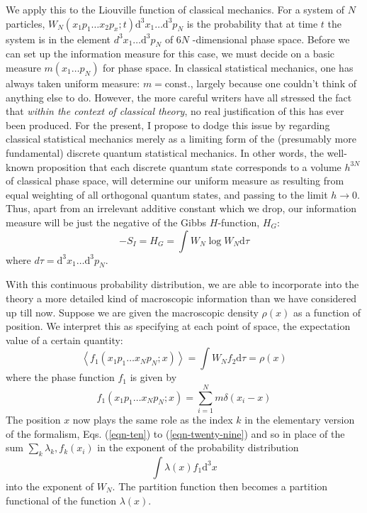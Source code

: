 \documentclass[]{article}
\begin{document}
We apply this to the Liouville function of classical mechanics. For a system of $N$ particles, $W _{ N }\left( x _{1} p _{1} \ldots x _{2} p _{ x } ; t \right)\text{d}^{3} x _{1} \ldots\text{d}^{3} p _{ N }$ is the
probability that at time $t$ the system is in the element $d^{3} x_{1} \ldots\text{d}^{3} p_{N}$ of $6 N$ -dimensional phase space. Before we can set up the information measure for this case, we must decide on a basic measure $m\left(x_{1} \ldots p_{N}\right)$ for phase space. In classical statistical mechanics, one has always taken uniform measure: $m=\text{const}.$, largely because one couldn't think of anything else to do. However, the more careful writers have all stressed the fact that \emph{within the context of classical theory}, no real justification of this has ever been produced. For the present, I propose to dodge this issue by regarding classical statistical mechanics merely as a limiting form of the (presumably more fundamental) discrete quantum statistical mechanics. In other words, the well-known proposition that each discrete quantum state corresponds to a volume $h ^{3N}$ of classical phase space, will determine our uniform measure as resulting from equal weighting of all orthogonal quantum states, and passing to the limit $h \rightarrow 0$. Thus, apart from an irrelevant additive constant which we drop, our information measure will be just the negative of the Gibbs $H$-function, $H_{G}$:
\begin{equation}
- S _{ I }= H _{ G }=\int W _{ N } \log W _{ N }\text{d}\tau
\end{equation}
where $d \tau=\text{d}^{3} x _{1} \ldots\text{d}^{3} p _{ N }$.

With this continuous probability distribution, we are able to incorporate into the theory a more detailed kind of macroscopic information than we have considered up till now. Suppose we are given the macroscopic density $\rho(x)$ as a function of position. We interpret this as specifying at each point of space, the expectation value of a certain quantity:
\begin{equation}
\left\langle f_{1}\left(x_{1} p_{1} \ldots x_{N} p_{N} ; x\right)\right\rangle=\int W_{N} f_{2}\text{d}\tau=\rho(x)
\end{equation}
where the phase function $f _{1}$ is given by
\begin{equation}
f _{1}\left( x _{1} p _{1} \ldots x _{ N } p _{ N } ; x \right)=\sum_{ i =1}^{ N } m \delta\left( x _{ i }- x \right) \label{eqn-sixty-eight}
\end{equation}
The position $x$ now plays the same role as the index $k$ in the elementary version of the formalism, Eqs. (\ref{eqn-ten}) to (\ref{eqn-twenty-nine}) and so in place of the sum $\sum_{k} \lambda_{k}, f_{k}\left(x_{i}\right)$ in the exponent of the probability distribution
\begin{equation}
\int \lambda(x) f_{1}\text{d}^{3} x \nonumber
\end{equation}
into the exponent of $W _{ N }$. The partition function then becomes a partition functional of the function $\lambda( x )$. 
\end{document}
